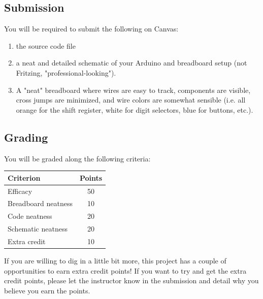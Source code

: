    \subsection*{Submission}
    You will be required to submit the following on Canvas:
    \begin{enumerate}
        \item the source code file
        \item a neat and detailed schematic of your Arduino and breadboard setup (not Fritzing, "professional-looking").
        \item A "neat" breadboard where wires are easy to track, components are visible, cross jumps are minimized, and wire colors are somewhat sensible (i.e. all orange for the shift register, white for digit selectors, blue for buttons, etc.).
    \end{enumerate}

    \subsection*{Grading}
    You will be graded along the following criteria:

    \begin{margintable}[-0.5in]
        \begin{tabular}{ l | c }
            \toprule
            Criterion & Points \\

            \midrule
            Efficacy & 50 \\
            Breadboard neatness & 10 \\
            Code neatness & 20 \\
            Schematic neatness & 20 \\
            Extra credit & 10 \\

            \bottomrule
        \end{tabular}
    \end{margintable}

    If you are willing to dig in a little bit more, this project has a couple of opportunities to earn extra credit points!
    If you want to try and get the extra credit points, please let the instructor know in the submission and detail why you believe you earn the points.
